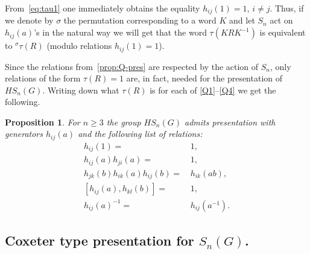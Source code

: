 \documentclass[oneside, 10pt]{amsart}
\theoremstyle{plain}
\numberwithin{equation}{section}
\numberwithin{lemma}{section}
\newtheorem{prop}[lemma]{Proposition}
\theoremstyle{remark}
\theoremstyle{definition}
\begin{document}
From~\eqref{eq:tau1} one immediately obtains the equality $h_{ij}(1)=1$, $i\neq j$.
Thus, if we denote by $\sigma$ the permutation corresponding to a word $K$ and let $S_n$ act on $h_{ij}(a)$'s in the natural way
 we will get that the word $\tau(KRK^{-1})$ is equivalent to ${}^{\sigma}\tau(R)$ (modulo relations $h_{ij}(1)=1$). 

Since the relations from~\cref{prop:Q-pres} are respected by the action of $S_n$,
 only relations of the form $\tau(R)=1$ are, in fact, needed for the presentation of $HS_n(G)$.
Writing down what $\tau(R)$ is for each of \eqref{Q1}--\eqref{Q4} we get the following.
 
\begin{prop} \label{prop:HSpres} For $n\geq 3$ the group $HS_n(G)$ admits presentation with generators $h_{ij}(a)$ and the following list of relations:
\begin{align}
h_{ij}(1)                     = &\, 1,              \tag{R0} \label{H0} \\
h_{ij}(a) h_{ji}(a)           = &\, 1,              \tag{R1} \label{H1} \\
h_{jk}(b) h_{ik}(a) h_{ij}(b) = &\, h_{ik}(ab),     \tag{R2} \label{H2} \\
[h_{ij}(a), h_{kl}(b)]        = &\, 1,              \tag{R3} \label{H3} \\
h_{ij}(a)^{-1}                = &\, h_{ij}(a^{-1}). \tag{R4} \label{H4}
\end{align}
\end{prop}

\subsection{Coxeter type presentation for $S_n(G)$.}
\end{document}

